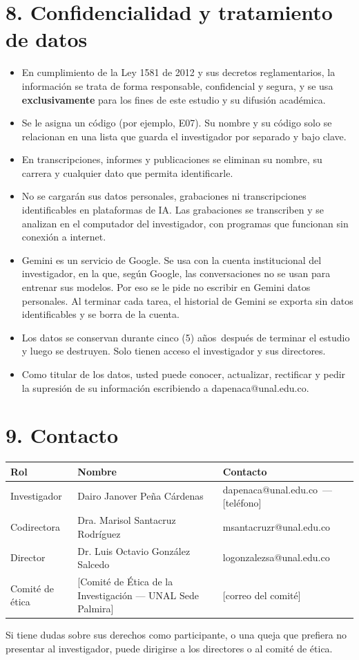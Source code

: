 \documentclass[11pt,letterpaper]{article}
\makeatletter
\newcommand{\Investigador}{Dairo Janover Peña Cárdenas}
\newcommand{\CorreoInv}{dapenaca@unal.edu.co}
\newcommand{\TelInv}{[teléfono]}
\newcommand{\Directora}{Dra. Marisol Santacruz Rodríguez}
\newcommand{\CorreoDirectora}{msantacruzr@unal.edu.co}
\newcommand{\Director}{Dr. Luis Octavio González Salcedo}
\newcommand{\CorreoDirector}{logonzalezsa@unal.edu.co}
\newcommand{\Comite}{[Comité de Ética de la Investigación --- UNAL Sede Palmira]}
\newcommand{\CorreoComite}{[correo del comité]}
\newcommand{\Conservacion}{cinco (5) años}
\makeatother
\begin{document}
\section*{8. Confidencialidad y tratamiento de datos}
\begin{itemize}
  \item En cumplimiento de la Ley 1581 de 2012 y sus decretos reglamentarios, la información se trata de forma responsable, confidencial y segura, y se usa \textbf{exclusivamente} para los fines de este estudio y su difusión académica.
  \item Se le asigna un código (por ejemplo, E07). Su nombre y su código solo se relacionan en una lista que guarda el investigador por separado y bajo clave.
  \item En transcripciones, informes y publicaciones se eliminan su nombre, su carrera y cualquier dato que permita identificarle.
  \item No se cargarán sus datos personales, grabaciones ni transcripciones identificables en plataformas de IA. Las grabaciones se transcriben y se analizan en el computador del investigador, con programas que funcionan sin conexión a internet.
  \item Gemini es un servicio de Google. Se usa con la cuenta institucional del investigador, en la que, según Google, las conversaciones no se usan para entrenar sus modelos. Por eso se le pide no escribir en Gemini datos personales. Al terminar cada tarea, el historial de Gemini se exporta sin datos identificables y se borra de la cuenta.
  \item Los datos se conservan durante \Conservacion\ después de terminar el estudio y luego se destruyen. Solo tienen acceso el investigador y sus directores.
  \item Como titular de los datos, usted puede conocer, actualizar, rectificar y pedir la supresión de su información escribiendo a \CorreoInv.
\end{itemize}

\section*{9. Contacto}
\begin{center}
\small
\begin{tabularx}{\linewidth}{@{}p{3cm}p{5.8cm}L@{}}
\toprule
\textbf{Rol} & \textbf{Nombre} & \textbf{Contacto}\\
\midrule
Investigador & \Investigador & \CorreoInv\ --- \TelInv\\
Codirectora & \Directora & \CorreoDirectora\\
Director & \Director & \CorreoDirector\\
Comité de ética & \Comite & \CorreoComite\\
\bottomrule
\end{tabularx}
\end{center}
\noindent Si tiene dudas sobre sus derechos como participante, o una queja que prefiera no presentar al investigador, puede dirigirse a los directores o al comité de ética.
\end{document}
